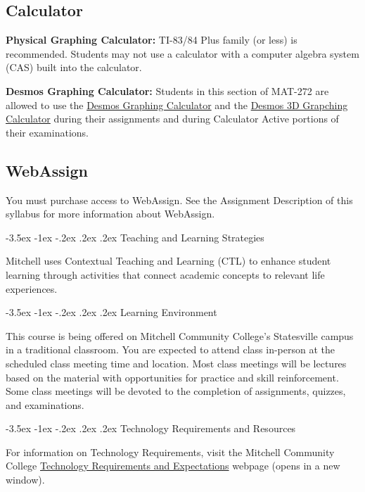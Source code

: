 \documentclass{article}
\makeatletter
\renewcommand\section{\@startsection{section}{1}{0pt}%
  {-3.5ex \@plus -1ex \@minus -.2ex}%
  {.2ex \@plus.2ex}%
  {\normalfont\Large\bfseries}} %
\makeatother
\begin{document}
\subsection{Calculator}

\textbf{Physical Graphing Calculator:} TI-83/84 Plus family (or less) is recommended. Students may not use a calculator with a computer algebra system (CAS) built into the calculator.

\textbf{Desmos Graphing Calculator:} Students in this section of MAT-272 are allowed to use the \href{https://www.desmos.com/calculator}{Desmos Graphing Calculator} and the \href{http://www.desmos.com/3d}{Desmos 3D Grapching Calculator} during their assignments and during Calculator Active portions of their examinations.

\subsection{WebAssign}

You must purchase access to WebAssign. See the Assignment Description of this syllabus for more information about WebAssign.

\section{Teaching and Learning Strategies}

Mitchell uses Contextual Teaching and Learning (CTL) to enhance student learning through activities that connect academic concepts to relevant life experiences.

\section{Learning Environment}

This course is being offered on Mitchell Community College's Statesville campus in a traditional classroom. You are expected to attend class in-person at the scheduled class meeting time and location. Most class meetings will be lectures based on the material with opportunities for practice and skill reinforcement. Some class meetings will be devoted to the completion of assignments, quizzes, and examinations.

\section{Technology Requirements and Resources}

For information on Technology Requirements, visit the Mitchell Community College \href{https://www.mitchellcc.edu/college-credit-online-classes/\#online-learning}{Technology Requirements and Expectations} webpage (opens in a new window).
\end{document}
